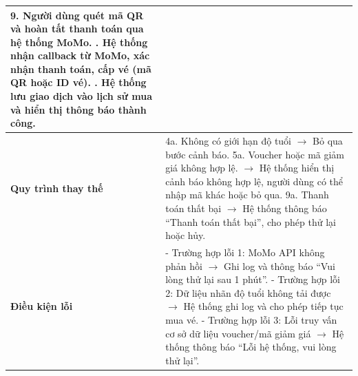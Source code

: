 \begin{longtable}{|p{}|p{}|}
9. Người dùng quét mã QR và hoàn tất thanh toán qua hệ thống MoMo. \newline
10. Hệ thống nhận callback từ MoMo, xác nhận thanh toán, cấp vé (mã QR hoặc ID vé). \newline
11. Hệ thống lưu giao dịch vào lịch sử mua và hiển thị thông báo thành công. \\ \hline
\textbf{Quy trình thay thế} &
4a. Không có giới hạn độ tuổi $\rightarrow$ Bỏ qua bước cảnh báo. \newline
5a. Voucher hoặc mã giảm giá không hợp lệ.
$\rightarrow$ Hệ thống hiển thị cảnh báo không hợp lệ, người dùng có thể nhập mã khác hoặc bỏ qua. \newline
9a. Thanh toán thất bại $\rightarrow$ Hệ thống thông báo “Thanh toán thất bại”, cho phép thử lại hoặc hủy. \\ \hline
\textbf{Điều kiện lỗi} &
- Trường hợp lỗi 1: MoMo API không phản hồi $\rightarrow$ Ghi log và thông báo “Vui lòng thử lại sau 1 phút”. \newline
- Trường hợp lỗi 2: Dữ liệu nhãn độ tuổi không tải được $\rightarrow$ Hệ thống ghi log và cho phép tiếp tục mua vé. \newline
- Trường hợp lỗi 3: Lỗi truy vấn cơ sở dữ liệu voucher/mã giảm giá $\rightarrow$ Hệ thống thông báo “Lỗi hệ thống, vui lòng thử lại”. \\ \hline
\end{longtable}
\vspace{15pt}


